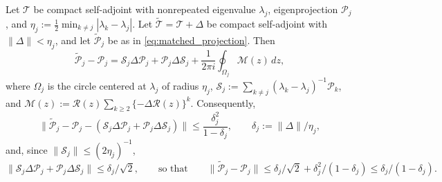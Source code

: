 \begin{theorem}
\label{thm:projection_perturbation}
Let $\mathcal{T}$ be compact self-adjoint with nonrepeated eigenvalue
$\lambda_j$, eigenprojection $\mathcal{P}_j$, and $\eta_j := \frac{1}{2}
\min_{k\neq j}|\lambda_k-\lambda_j|$. Let $\widetilde{\mathcal{T}}=
\mathcal{T}+\Delta$ be compact self-adjoint with $\|\Delta\|<\eta_j$, and
let $\widetilde{\mathcal{P}}_j$ be as in \eqref{eq:matched_projection}.
Then
\begin{equation}
\widetilde{\mathcal{P}}_j - \mathcal{P}_j = \mathcal{S}_j\Delta\mathcal{P}_j
+ \mathcal{P}_j\Delta\mathcal{S}_j + \frac{1}{2\pi i}\oint_{\Omega_j}
\mathcal{M}(z)\,dz,
\label{eq:projection_perturbation}
\end{equation}
where $\Omega_j$ is the circle centered at $\lambda_j$ of radius $\eta_j$,
$\mathcal{S}_j := \sum_{k\neq j}(\lambda_k-\lambda_j)^{-1}\mathcal{P}_k$,
and $\mathcal{M}(z) := \mathcal{R}(z)\sum_{k\geq 2}\{-\Delta\mathcal{R}
(z)\}^k$. Consequently,
\begin{equation}
\Big\|\widetilde{\mathcal{P}}_j-\mathcal{P}_j - (\mathcal{S}_j\Delta
\mathcal{P}_j+\mathcal{P}_j\Delta\mathcal{S}_j)\Big\| \leq
\frac{\delta_j^2}{1-\delta_j}, \qquad \delta_j := \|\Delta\|/\eta_j,
\label{eq:projection_perturbation_bound}
\end{equation}
and, since $\|\mathcal{S}_j\|\leq(2\eta_j)^{-1}$,
\begin{equation}
\|\mathcal{S}_j\Delta\mathcal{P}_j+\mathcal{P}_j\Delta\mathcal{S}_j\|\leq
\delta_j/\sqrt2, \qquad\text{so that}\qquad
\|\widetilde{\mathcal{P}}_j-\mathcal{P}_j\| \leq \delta_j/\sqrt2 +
\delta_j^2/(1-\delta_j) \leq \delta_j/(1-\delta_j).
\label{eq:projection_norm_bound}
\end{equation}
\end{theorem}

